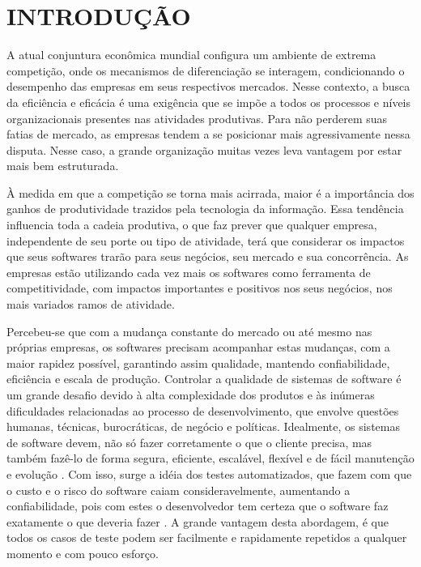 \chapter{INTRODUÇÃO}

A atual conjuntura econômica mundial configura um ambiente de extrema competição, onde os mecanismos de diferenciação se interagem, condicionando o desempenho das empresas em seus respectivos mercados. Nesse contexto, a busca da eficiência e eficácia é uma exigência que se impõe a todos os processos e níveis organizacionais presentes nas atividades produtivas. Para não perderem suas fatias de mercado, as empresas tendem a se posicionar mais agressivamente nessa disputa. Nesse caso, a grande organização muitas vezes leva vantagem por estar mais bem estruturada.

À medida em que a competição se torna mais acirrada, maior é a importância dos ganhos de produtividade trazidos pela tecnologia da informação. Essa tendência influencia toda a cadeia produtiva, o que faz prever que qualquer empresa, independente de seu porte ou tipo de atividade, terá que considerar os impactos que seus softwares trarão para seus negócios, seu mercado e sua concorrência. As empresas estão utilizando cada vez mais os softwares como ferramenta de competitividade, com impactos importantes e positivos nos seus negócios, nos mais variados ramos de atividade.

Percebeu-se que com a mudança constante do mercado ou até mesmo nas próprias empresas, os softwares precisam acompanhar estas mudanças, com a maior rapidez possível, garantindo assim qualidade, mantendo confiabilidade, eficiência e escala de produção. Controlar a qualidade de sistemas de software é um grande desafio devido à alta complexidade dos produtos e às inúmeras dificuldades relacionadas ao processo de desenvolvimento, que envolve questões humanas, técnicas, burocráticas, de negócio e políticas. Idealmente, os sistemas de software devem, não só fazer corretamente o que o cliente precisa, mas também fazê-lo de forma segura, eficiente, escalável, flexível e de fácil manutenção e evolução \cite{OLIVEIRA}. Com isso, surge a idéia dos testes automatizados, que fazem com que o custo e o risco do software caiam consideravelmente, aumentando a confiabilidade, pois com estes o desenvolvedor tem certeza que o software faz exatamente o que deveria fazer \cite{MYERS}. A grande vantagem desta abordagem, é que todos os casos de teste podem ser facilmente e rapidamente repetidos a qualquer momento e com pouco esforço.

